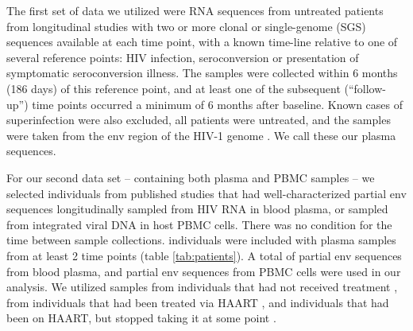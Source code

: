 The first set of data we utilized were RNA sequences from untreated patients from longitudinal studies with two or more clonal or single-genome (SGS) sequences available at each time point, with a known time-line relative to one of several reference points: HIV infection, seroconversion or presentation of symptomatic seroconversion illness. The samples were collected within 6 months (186 days) of this reference point, and at least one of the subsequent (“follow-up”) time points occurred a minimum of 6 months after baseline. Known cases of superinfection were also excluded, all patients were untreated, and the samples were taken from the env region of the HIV-1 genome \citep{McCloskey14}. We call these our plasma sequences. 
 
For our second data set -- containing both plasma and PBMC samples -- we selected  individuals from published studies that had well-characterized partial env sequences longitudinally sampled from HIV RNA in blood plasma, or sampled from integrated viral DNA in host PBMC cells. There was no condition for the time between sample collections.  individuals were included with 
plasma samples from at least 2 time points (table \ref{tab:patients}). A total of  partial env sequences from blood plasma, and  partial env sequences from PBMC cells were used in our analysis. We utilized samples from individuals that had not received treatment \citep{Shankarappa99, Novitsky09}, from individuals that had been treated via HAART \citep{Llewellyn06}, and individuals that had been on HAART, but stopped taking it at some point \citep{Fischer04}. 
 
